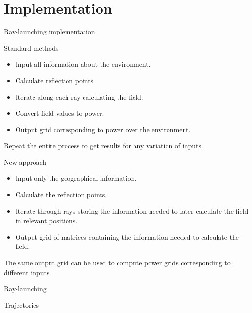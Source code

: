 \documentclass[8pt]{beamer}
\begin{document}
\section{Implementation}
\begin{frame}{Ray-launching implementation}
\begin{block}{Standard methods}
\begin{itemize}
\item Input all information about the environment.
\item Calculate reflection points
\item Iterate along each ray calculating the field.
\item Convert field values to power.
\item Output grid corresponding to power over the environment.
\end{itemize}
Repeat the entire process to get results for any variation of inputs.
\end{block}
\begin{block}{New approach}
\begin{itemize}
\item Input only the geographical information.
\item Calculate the reflection points.
\item Iterate through rays storing the information needed to later calculate the field in relevant positions.
\item Output grid of matrices containing the information needed to calculate the field.
\end{itemize}
The same output grid can be used to compute power grids corresponding to different inputs.
\end{block}
\end{frame}
\begin{frame}{Ray-launching}
\begin{block}{Trajectories}
\raysroom
\end{block}
\end{frame}
\end{document}
